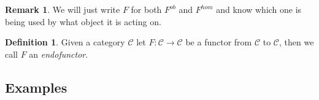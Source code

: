 \documentclass[11pt,a4paper]{article}
\theoremstyle{definition}
\newtheorem{definition}[thm]{Definition}
\newtheorem{remark}[thm]{Remark}
\numberwithin{equation}{section}
\begin{document}
\begin{remark}
\label{rmk:functnotation}
We will just write $F$ for both $F^{ob}$ and $F^{hom}$ and know which one is being used by what object it is acting on.
\end{remark}
\begin{definition}
\label{def:endofunctor}
Given a category $\mathscr{C}$ let $F\colon\mathscr{C}\rightarrow\mathscr{C}$ be a functor from $\mathscr{C}$ to $\mathscr{C}$, then we call $F$ an \emph{endofunctor}.
\end{definition}
\subsection{Examples}
\label{ss:funcexam}
\end{document}
